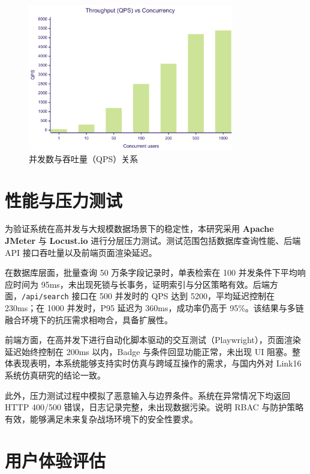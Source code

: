\begin{figure}[H]
  \begin{minipage}{0.48\textwidth}
    \centering
    \includegraphics[width=0.8\textwidth]{chapters/fig-0/performance-qps.png}
    \caption{并发数与吞吐量（QPS）关系}
    \label{fig:perf-qps}
  \end{minipage}
\end{figure}

\section{性能与压力测试}
为验证系统在高并发与大规模数据场景下的稳定性，本研究采用 \textbf{Apache JMeter} 与 \textbf{Locust.io} 进行分层压力测试。测试范围包括数据库查询性能、后端 API 接口吞吐量以及前端页面渲染延迟。\cite{schneckenburger_2018_nav_multipath}

在数据库层面，批量查询 50 万条字段记录时，单表检索在 100 并发条件下平均响应时间为 95ms，未出现死锁与长事务，证明索引与分区策略有效。后端方面，\texttt{/api/search} 接口在 500 并发时的 QPS 达到 5200，平均延迟控制在 230ms；在 1000 并发时，P95 延迟为 360ms，成功率仍高于 95\%。该结果与多链融合环境下的抗压需求相吻合，具备扩展性。

前端方面，在高并发下进行自动化脚本驱动的交互测试（Playwright），页面渲染延迟始终控制在 200ms 以内，Badge 与条件回显功能正常，未出现 UI 阻塞。整体表现表明，本系统能够支持实时仿真与跨域互操作的需求，与国内外对 Link16 系统仿真研究的结论一致。

此外，压力测试过程中模拟了恶意输入与边界条件。系统在异常情况下均返回 HTTP 400/500 错误，日志记录完整，未出现数据污染。说明 RBAC 与防护策略有效，能够满足未来复杂战场环境下的安全性要求。

\section{用户体验评估}


